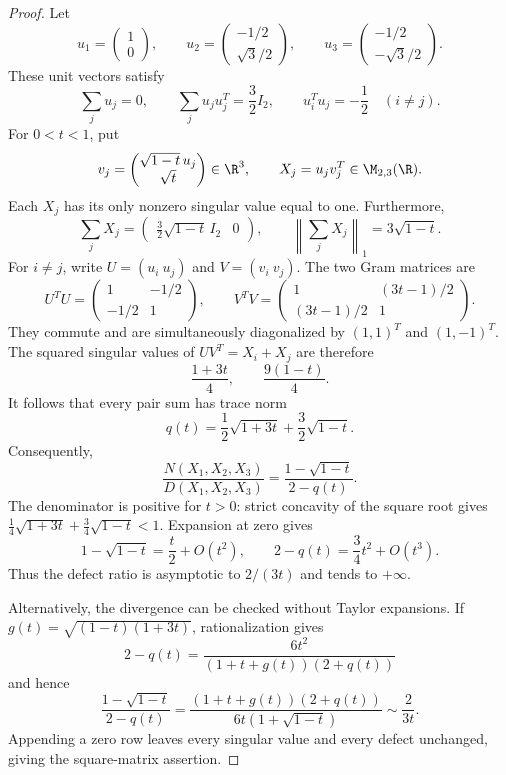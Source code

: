 \begin{proof}
Let
\[
 u_1=\begin{pmatrix}1\\0\end{pmatrix},\qquad
 u_2=\begin{pmatrix}-1/2\\\sqrt3/2\end{pmatrix},\qquad
 u_3=\begin{pmatrix}-1/2\\-\sqrt3/2\end{pmatrix}.
\]
These unit vectors satisfy
\[
 \sum_ju_j=0,\qquad \sum_ju_ju_j^T=\frac32I_2,\qquad
 u_i^Tu_j=-\frac12\quad(i\ne j).
\]
For $0<t<1$, put
\[
 v_j=\begin{pmatrix}\sqrt{1-t}\,u_j\\\sqrt t\end{pmatrix}\in\R^3,
 \qquad X_j=u_jv_j^T\in\M_{2,3}(\R).
\]
Each $X_j$ has its only nonzero singular value equal to one. Furthermore,
\[
 \sum_jX_j=\begin{pmatrix}\frac32\sqrt{1-t}\,I_2&0\end{pmatrix},
 \qquad\left\|\sum_jX_j\right\|_1=3\sqrt{1-t}.
\]
For $i\ne j$, write $U=(u_i\ u_j)$ and $V=(v_i\ v_j)$. The two Gram matrices are
\[
 U^TU=\begin{pmatrix}1&-1/2\\-1/2&1\end{pmatrix},\qquad
 V^TV=\begin{pmatrix}1&(3t-1)/2\\(3t-1)/2&1\end{pmatrix}.
\]
They commute and are simultaneously diagonalized by $(1,1)^T$ and $(1,-1)^T$. The squared singular values of $UV^T=X_i+X_j$ are therefore
\[
 \frac{1+3t}{4},\qquad\frac{9(1-t)}4.
\]
It follows that every pair sum has trace norm
\[
 q(t)=\frac12\sqrt{1+3t}+\frac32\sqrt{1-t}.
\]
Consequently,
\[
 \frac{N(X_1,X_2,X_3)}{D(X_1,X_2,X_3)}
 =\frac{1-\sqrt{1-t}}{2-q(t)}.
\]
The denominator is positive for $t>0$: strict concavity of the square root gives
$\frac14\sqrt{1+3t}+\frac34\sqrt{1-t}<1$.
Expansion at zero gives
\[
 1-\sqrt{1-t}=\frac t2+O(t^2),\qquad
 2-q(t)=\frac34t^2+O(t^3).
\]
Thus the defect ratio is asymptotic to $2/(3t)$ and tends to $+\infty$.

Alternatively, the divergence can be checked without Taylor expansions. If
$g(t)=\sqrt{(1-t)(1+3t)}$, rationalization gives
\[
 2-q(t)=\frac{6t^2}{(1+t+g(t))(2+q(t))}
\]
and hence
\[
 \frac{1-\sqrt{1-t}}{2-q(t)}
 =\frac{(1+t+g(t))(2+q(t))}{6t(1+\sqrt{1-t})}
 \sim\frac{2}{3t}.
\]
Appending a zero row leaves every singular value and every defect unchanged, giving the square-matrix assertion.
\end{proof}

